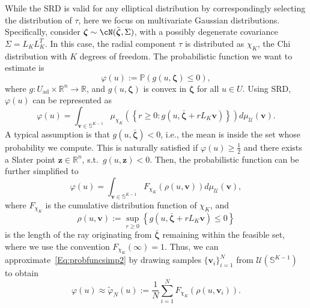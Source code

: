 \documentclass[%
onefignum,onetabnum]{siamonline250211}
\newcommand{\bbP}{\mathbb P}
\newcommand{\bbR}{\mathbb R}
\newcommand{\bbS}{\mathbb S}
\newcommand{\cU}{\mathcal U} \newcommand{\cV}{\mathcal V}
\begin{document}
While the SRD is valid for any elliptical distribution by correspondingly selecting the distribution of $\tau$, here we focus on multivariate Gaussian distributions. Specifically, consider $\boldsymbol{\zeta} \sim \cN(\bar{\boldsymbol{\zeta}}, \Sigma)$, with a possibly degenerate covariance $\Sigma=L_K L_K^T$. In this case, the radial component $\tau$ is distributed as $\chi_K$, the Chi distribution with $K$ degrees of freedom. The probabilistic function we want to estimate is
\begin{equation}\label{Eq:probfunc}
    \varphi(u) := \bbP(g(u,\boldsymbol{\zeta})\leq 0),
\end{equation}
where $g:U_{\mathrm{ad}}\times \bbR^n\to\bbR$, and $g(u,\boldsymbol{\zeta})$ is convex in $\boldsymbol{\zeta}$ for all $u\in U$. Using SRD, $\varphi(u)$ 
can be represented as
\begin{equation}\label{eq:phi(u)}
    \varphi(u)=\int_{\boldsymbol{v}\in\bbS^{K-1}}\mu_{\chi_K}\left( \left\{ r\geq 0: g(u,\bar{\boldsymbol{\zeta}}+r L_K\boldsymbol{v}) \right\} \right)d\mu_{\cU} (\boldsymbol{v}).
\end{equation}
A typical assumption is that $g(u,\bar{\boldsymbol{\zeta}})<0$, i.e., the mean is inside the set whose probability we compute. This is naturally satisfied if $\varphi(u)\geq \frac{1}{2}$ and there exists a Slater point $\boldsymbol{z}\in\bbR^n$, s.t.\ $g(u,\boldsymbol{z})<0$. Then, the probabilistic function can be further simplified to
\begin{equation}\label{Eq:probfuncsimp2}
    \varphi(u)=\int_{\boldsymbol{v}\in\bbS^{K-1}}F_{\chi_K}\left( \rho(u,\boldsymbol{v}) \right)d\mu_{\cU} (\boldsymbol{v}),
\end{equation}
where $F_{\chi_K}$ is the cumulative distribution function of $\chi_K$, and
\begin{equation*}
    \rho(u,\boldsymbol{v}):=\sup_{r\geq 0}{\left\{ g(u,\bar{\boldsymbol{\zeta}}+r L_K\boldsymbol{v})\leq 0 \right\}}
\end{equation*}
is the length of the ray originating from $\bar{\boldsymbol\zeta}$ remaining within the feasible set, where we use the convention $F_{\chi_K}(\infty)=1$. Thus, we can approximate~\eqref{Eq:probfuncsimp2} by drawing samples $\{\boldsymbol{v}_i\}_{i=1}^N$ from $\cU(\bbS^{K-1})$ to obtain
\begin{equation}\label{eq:phiN(u)}
    \varphi(u)\approx \tilde{\varphi}_N(u):=\frac{1}{N}\sum_{i=1}^N F_{\chi_K}\left( \rho(u,\boldsymbol{v}_i) \right).
\end{equation}
\end{document}

